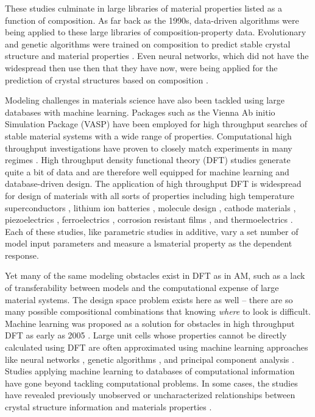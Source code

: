 These studies culminate in large libraries of material properties listed as a function of composition. As far back as the 1990s, data-driven algorithms were being applied to these large libraries of composition-property data. Evolutionary and genetic algorithms were trained on composition to predict stable crystal structure and material properties \cite{Deaven1995, Morris1996, Woodley1999, Stucke2003, Wolf2000}. Even neural networks, which did not have the widespread then use then that they have now, were being applied for the prediction of crystal structures based on composition \cite{Sumpter1996}. 

Modeling challenges in materials science have also been tackled using large databases with machine learning. Packages such as the Vienna Ab initio Simulation Package (VASP) have been employed for high throughput searches of stable material systems with a wide range of properties. Computational high throughput investigations have proven to closely match experiments in many regimes \cite{Curtarolo2005}. 
High throughput density functional theory (DFT) studies generate quite a bit of data and are therefore well equipped for machine learning and database-driven design. The application of high throughput DFT is widespread for design of materials with all sorts of properties including high temperature superconductors \cite{Kolmogorov2006}, lithium ion batteries \cite{Kang2006, Chen2012, Kirklin2013}, molecule design \cite{Mannodi-Kanakkithodi2016, Butler2018}, cathode materials \cite{Hautier2013}, piezoelectrics \cite{Roy2012}, ferroelectrics \cite{Bennett2012}, corrosion resistant films \cite{Ciobanu2005}, and thermoelectrics \cite{Wang2011, Yan2015}. Each of these studies, like parametric studies in additive, vary a set number of model input parameters and measure a lsmaterial property as the dependent response.

Yet many of the same modeling obstacles exist in DFT as in AM, such as a lack of transferability between models and the computational expense of large material systems. The design space problem exists here as well -- there are so many possible compositional combinations that knowing \textit{where} to look is difficult. Machine learning was proposed as a solution for obstacles in high throughput DFT as early as 2005 \cite{Morgan2005}.  Large unit cells whose properties cannot be directly calculated using DFT are often approximated using machine learning approaches like neural networks \cite{Behler2015}, genetic algorithms \cite{Hart2005}, and principal component analysis \cite{Snyder2012}. Studies applying machine learning to databases of computational information have gone beyond tackling computational problems. In some cases, the studies have revealed previously unobserved or uncharacterized relationships between crystal structure information and materials properties \cite{Ghiringhelli2015}. 

